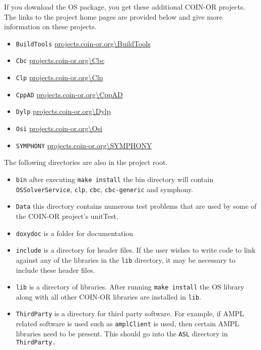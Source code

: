 \documentclass[11pt]{article}
\renewcommand{\_}{{\char"5F}}
\renewcommand{\{}{{\char"7B}}
\renewcommand{\}}{{\char"7D}}
\renewcommand{\^}{{\char"0D}}
\renewcommand{\'}{{\char"0D}}
\begin{document}
If you download the OS package, you get these additional COIN-OR projects. The links to the project home pages are provided below and give more information on these projects. 
\begin{itemize}
\item {\tt BuildTools} \url{projects.coin-or.org\BuildTools}
\item {\tt Cbc} \url{projects.coin-or.org\Cbc}
\item {\tt Clp}  \url{projects.coin-or.org\Clp}
\item {\tt CppAD} \url{projects.coin-or.org\CppAD}
\item {\tt Dylp} \url{projects.coin-or.org\Dylp}
\item {\tt Osi} \url{projects.coin-or.org\Osi}
\item {\tt SYMPHONY}   \url{projects.coin-or.org\SYMPHONY}
\end{itemize}

The following directories are also in the project root. 
\begin{itemize}
\item {\tt bin} after executing {\tt make install} the bin directory will contain {\tt OSSolverService}, {\tt clp}, {\tt cbc},  {\tt cbc-generic} and {symphony}.

\item {\tt Data} this directory contains numerous test problems that are used by some of the COIN-OR project's unitTest.

\item {\tt doxydoc} is a folder for documentation

\item {\tt include} is a directory for header files. If the user wishes to write code to link against any of the libraries in the {\tt lib} directory, it may be necessary to include these header files.

\item {\tt lib} is a directory of libraries. After running {\tt make install} the OS library along with all other COIN-OR libraries are installed in {\tt lib}.

\item {\tt ThirdParty} is a  directory for third party software. For example, if AMPL related software is used such as {\tt amplClient} is used, then certain AMPL libraries need to be present. This should go into the {\tt ASL} directory in {\tt ThirdParty.}
\end{itemize}
\end{document}
